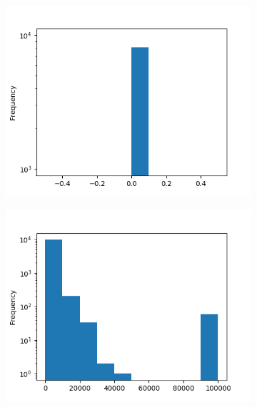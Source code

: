 \begin{figure}[!ht]
    \caption{Earned dividends histograms.}
    \label{fig:earned-dividents-hist}

    \begin{subfigure}[ht]{.5\linewidth}
        \centering
        \includegraphics[width=\textwidth]{./img/earned-dividends-hist-original.png}
    \end{subfigure}
    \begin{subfigure}[ht]{.5\linewidth}
        \centering
        \includegraphics[width=\textwidth]{./img/earned-dividends-hist-new.png}
    \end{subfigure}


\end{figure}
